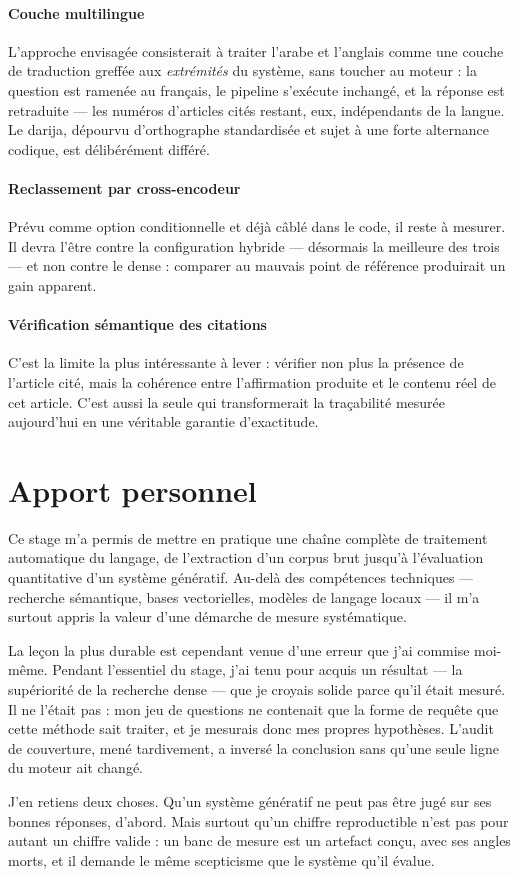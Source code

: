\paragraph{Couche multilingue}
L'approche envisagée consisterait à traiter l'arabe et l'anglais comme une couche de traduction
greffée aux \emph{extrémités} du système, sans toucher au moteur : la question est ramenée au
français, le pipeline s'exécute inchangé, et la réponse est retraduite --- les numéros d'articles
cités restant, eux, indépendants de la langue. Le darija, dépourvu d'orthographe standardisée et
sujet à une forte alternance codique, est délibérément différé.

\paragraph{Reclassement par cross-encodeur}
Prévu comme option conditionnelle et déjà câblé dans le code, il reste à mesurer. Il devra l'être
contre la configuration hybride --- désormais la meilleure des trois --- et non contre le dense :
comparer au mauvais point de référence produirait un gain apparent.

\paragraph{Vérification sémantique des citations}
C'est la limite la plus intéressante à lever : vérifier non plus la présence de l'article cité,
mais la cohérence entre l'affirmation produite et le contenu réel de cet article. C'est aussi la
seule qui transformerait la traçabilité mesurée aujourd'hui en une véritable garantie d'exactitude.

\section*{Apport personnel}

Ce stage m'a permis de mettre en pratique une chaîne complète de traitement automatique du
langage, de l'extraction d'un corpus brut jusqu'à l'évaluation quantitative d'un système
génératif. Au-delà des compétences techniques --- recherche sémantique, bases vectorielles,
modèles de langage locaux --- il m'a surtout appris la valeur d'une démarche de mesure
systématique.

La leçon la plus durable est cependant venue d'une erreur que j'ai commise moi-même. Pendant
l'essentiel du stage, j'ai tenu pour acquis un résultat --- la supériorité de la recherche dense
--- que je croyais solide parce qu'il était mesuré. Il ne l'était pas : mon jeu de questions ne
contenait que la forme de requête que cette méthode sait traiter, et je mesurais donc mes propres
hypothèses. L'audit de couverture, mené tardivement, a inversé la conclusion sans qu'une seule
ligne du moteur ait changé.

J'en retiens deux choses. Qu'un système génératif ne peut pas être jugé sur ses bonnes réponses,
d'abord. Mais surtout qu'un chiffre reproductible n'est pas pour autant un chiffre valide : un banc
de mesure est un artefact conçu, avec ses angles morts, et il demande le même scepticisme que le
système qu'il évalue.
